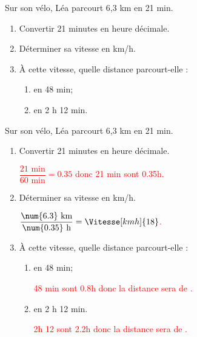\begin{exercice*}
    Sur son vélo, Léa parcourt 6,3 km en 21 min.
    \begin{enumerate}
        \item Convertir 21 minutes en heure décimale.
        \item Déterminer sa vitesse en km/h.
        \item À cette vitesse, quelle distance parcourt-elle :
        \begin{enumerate}
            \item en 48 min;
            \item en 2 h 12 min.
        \end{enumerate}
    \end{enumerate}
\end{exercice*}
\begin{corrige}
    Sur son vélo, Léa parcourt 6,3 km en 21 min.
    \begin{enumerate}
        \item Convertir 21 minutes en heure décimale.
        \par\textcolor{red}{$\dfrac{21\text{ min}}{60\text{ min}}=\num{0.35}$ donc 21 min sont \num{0.35}h.}
        \item Déterminer sa vitesse en km/h.
        \par\textcolor{red}{$\dfrac{\num{6.3}\text{ km}}{\num{0.35}\text{ h}}=\Vitesse[kmh]{18}$.}
        \item À cette vitesse, quelle distance parcourt-elle :
        \begin{enumerate}
            \item en 48 min;
            \par\textcolor{red}{48 min sont \num{0.8}h donc la distance sera de .}
            \item en 2 h 12 min.
            \par\textcolor{red}{2h 12 sont \num{2.2}h donc la distance sera de .}
        \end{enumerate}
    \end{enumerate}
\end{corrige}

